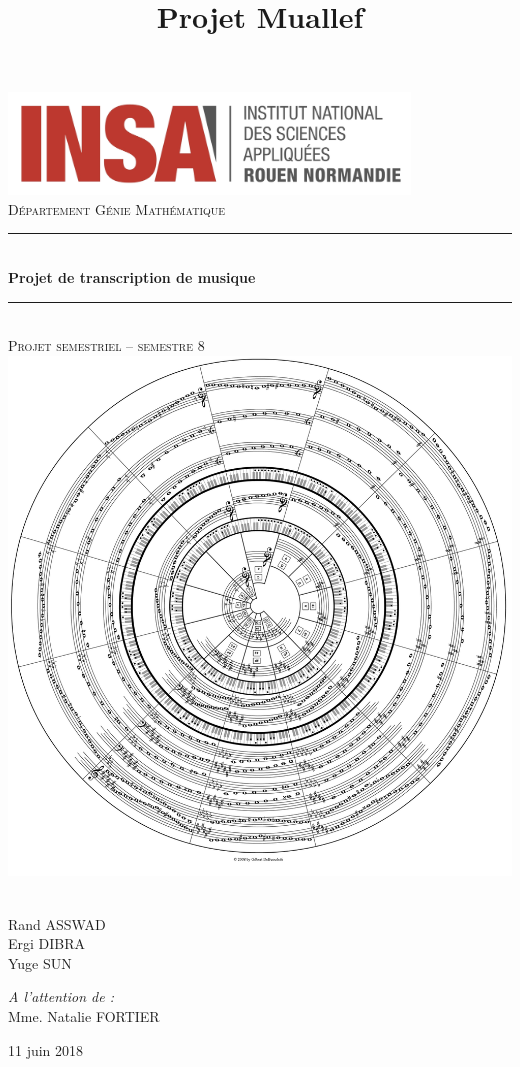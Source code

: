 \documentclass[french,]{article}
\title{Projet Muallef}
\author{}
\date{}
\newcommand{\HRule}{\rule{\linewidth}{0.5mm}}
\begin{document}
\maketitle

\begin{titlepage}
  \begin{sffamily}
  \begin{center}
	\includegraphics[width=0.8\textwidth]{img/INSA_logo}\\[2cm]

    \textsc{\huge Département Génie Mathématique}\\[0.7cm]

    \HRule \\[0.4cm]
    {\huge \bfseries Projet de transcription de musique \\[0.4cm]}
    \HRule \\[1cm]
	\textsc{\huge Projet semestriel -- semestre 8}\\[0.7cm]

    \includegraphics[width=.6\textwidth]{img/cover_img.png}~\\[1cm]

    \begin{minipage}{0.4\textwidth}
		\Large\raggedright
        Rand ASSWAD\\
		Ergi DIBRA\\
		Yuge SUN
    \end{minipage}
    \begin{minipage}{0.4\textwidth}
		\Large\raggedleft
		\emph{A l'attention de :}\\
		Mme. Natalie FORTIER
    \end{minipage}

	\vfill
    {\large 11 juin 2018}
  \end{center}
  \end{sffamily}
\end{titlepage}
\end{document}
